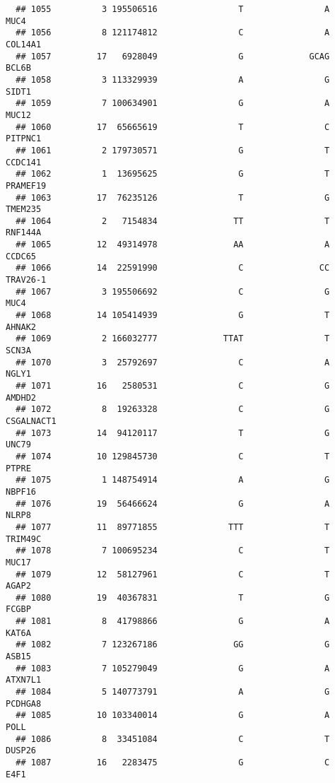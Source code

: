 \documentclass[12pt,twoside]{reedthesis}
\theoremstyle{definition}
\theoremstyle{definition}
\theoremstyle{remark}
\begin{document}
\begin{verbatim}
  ## 1055          3 195506516                T                A           MUC4
  ## 1056          8 121174812                C                A        COL14A1
  ## 1057         17   6928049                G             GCAG          BCL6B
  ## 1058          3 113329939                A                G          SIDT1
  ## 1059          7 100634901                G                A          MUC12
  ## 1060         17  65665619                T                C        PITPNC1
  ## 1061          2 179730571                G                T        CCDC141
  ## 1062          1  13695625                G                T       PRAMEF19
  ## 1063         17  76235126                T                G        TMEM235
  ## 1064          2   7154834               TT                T        RNF144A
  ## 1065         12  49314978               AA                A         CCDC65
  ## 1066         14  22591990                C               CC       TRAV26-1
  ## 1067          3 195506692                C                G           MUC4
  ## 1068         14 105414939                G                T         AHNAK2
  ## 1069          2 166032777             TTAT                T          SCN3A
  ## 1070          3  25792697                C                A          NGLY1
  ## 1071         16   2580531                C                G         AMDHD2
  ## 1072          8  19263328                C                G     CSGALNACT1
  ## 1073         14  94120117                T                G          UNC79
  ## 1074         10 129845730                C                T          PTPRE
  ## 1075          1 148754914                A                G         NBPF16
  ## 1076         19  56466624                G                A          NLRP8
  ## 1077         11  89771855              TTT                T        TRIM49C
  ## 1078          7 100695234                C                T          MUC17
  ## 1079         12  58127961                C                T          AGAP2
  ## 1080         19  40367831                T                G          FCGBP
  ## 1081          8  41798866                G                A          KAT6A
  ## 1082          7 123267186               GG                G          ASB15
  ## 1083          7 105279049                G                A        ATXN7L1
  ## 1084          5 140773791                A                G        PCDHGA8
  ## 1085         10 103340014                G                A           POLL
  ## 1086          8  33451084                C                T         DUSP26
  ## 1087         16   2283475                G                C           E4F1

\end{verbatim}
\end{document}
